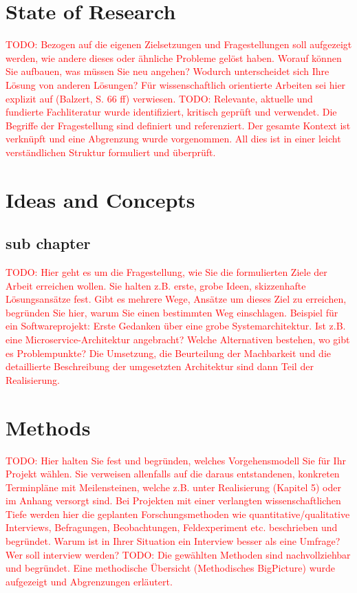 \documentclass[a4paper,12pt]{report}
\renewcommand{\todo}[1]{\textcolor{red}{TODO: #1}}
\begin{document}
	
	\chapter{State of Research}
		\todo{Bezogen auf die eigenen Zielsetzungen und Fragestellungen soll aufgezeigt werden, wie andere dieses oder ähnliche Probleme gelöst haben. Worauf können Sie aufbauen, was müssen Sie neu angehen?	Wodurch unterscheidet sich Ihre Lösung von anderen Lösungen? Für wissenschaftlich orientierte Arbeiten sei hier explizit auf (Balzert, S. 66 ff) verwiesen.}
		\todo{Relevante, aktuelle und fundierte Fachliteratur wurde identifiziert, kritisch geprüft und verwendet. Die Begriffe der Fragestellung sind definiert und referenziert. Der gesamte Kontext ist verknüpft und eine Abgrenzung wurde vorgenommen. All dies ist in einer leicht verständlichen Struktur formuliert und überprüft.}
	
	\chapter{Ideas and Concepts}
	\section{sub chapter}
		\todo{Hier geht es um die Fragestellung, wie Sie die formulierten Ziele der Arbeit erreichen wollen. Sie halten z.B. erste, grobe Ideen, skizzenhafte Lösungsansätze fest. Gibt es mehrere Wege, Ansätze um dieses Ziel zu erreichen, begründen Sie hier, warum Sie einen bestimmten Weg einschlagen. Beispiel für ein Softwareprojekt: Erste Gedanken über eine grobe Systemarchitektur. Ist z.B. eine Microservice-Architektur angebracht? Welche Alternativen bestehen, wo gibt es Problempunkte? Die Umsetzung, die Beurteilung der Machbarkeit und die detaillierte Beschreibung der umgesetzten Architektur sind dann Teil der Realisierung.}
	
	\chapter{Methods}
		\todo{Hier halten Sie fest und begründen, welches Vorgehensmodell Sie für Ihr Projekt wählen. Sie verweisen allenfalls auf die daraus entstandenen, konkreten Terminpläne mit Meilensteinen, welche z.B. unter Realisierung (Kapitel 5) oder im Anhang versorgt sind. Bei Projekten mit einer verlangten wissenschaftlichen Tiefe werden hier die geplanten Forschungsmethoden wie quantitative/qualitative Interviews, Befragungen, Beobachtungen, Feldexperiment etc. beschrieben und begründet. Warum ist in Ihrer Situation ein Interview besser als eine Umfrage? Wer soll interview werden?}
		\todo{Die gewählten Methoden sind nachvollziehbar und begründet. Eine methodische Übersicht (Methodisches BigPicture) wurde aufgezeigt und Abgrenzungen erläutert.}
	
\end{document}
